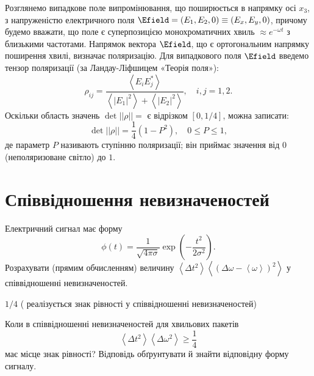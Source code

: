 \begin{Theory}
Розглянемо випадкове поле випромінювання, що поширюється в напрямку осі $x_3$, з напруженістю електричного поля  $\Efield = (E_1,E_2,0) \equiv
(E_x,E_y,0)$, причому будемо вважати, що поле є суперпозицією монохроматичних хвиль $\approx e^{-\omega t}$  з близькими частотами. Напрямок вектора
$\Efield$, що є ортогональним напрямку поширення хвилі, визначає поляризацію. Для випадкового поля $\Efield$ введемо тензор поляризації (за
Ландау-Ліфшицем «Теорія поля»):
	\begin{equation}\label{eq:polarization_tensor}
		\rho_{ij} = \frac{\left\langle E_{i} E_{j}^* \right\rangle }{\left\langle |E_1|^2\right\rangle + \left\langle |E_2|^2\right\rangle },\quad i,j =
		1,2.
	\end{equation}
Оскільки область значень $\det||\rho|| = $ є відрізком $[0,1/4]$, можна записати:
	\begin{equation}\label{eq:polarization_lewel}
		\det||\rho|| = \frac14(1 - P^2),\quad 0\le P \le 1,
	\end{equation}
де параметр $P$ називають ступінню поляризації; він приймає значення від $0$ (неполяризоване світло) до $1$.
\end{Theory}




\section{Співвідношення невизначеностей}

\begin{problem}
Електричний сигнал має форму
\[
	\phi(t) = \frac{1}{\sqrt{4\pi\sigma}} \exp\left( -\frac{t^2}{2\sigma^2}\right).
\]
Розрахувати (прямим обчисленням) величину $\left\langle \Delta t^2 \right\rangle \left\langle \left(\Delta \omega  - \left\langle \omega  \right\rangle\right)^2 \right\rangle$  у співвідношенні невизначеностей.
\begin{solution}
	$1/4$ ( реалізується знак рівності у співвідношенні невизначеностей)
\end{solution}
\end{problem}


\begin{problem}
Коли в співвідношенні невизначеностей для хвильових пакетів
\[
	\left\langle \Delta t^2 \right\rangle\left\langle \Delta \omega^2 \right\rangle \ge \frac14
\]
має місце знак рівності? Відповідь обґрунтувати й знайти відповідну форму сигналу.
\end{problem}


